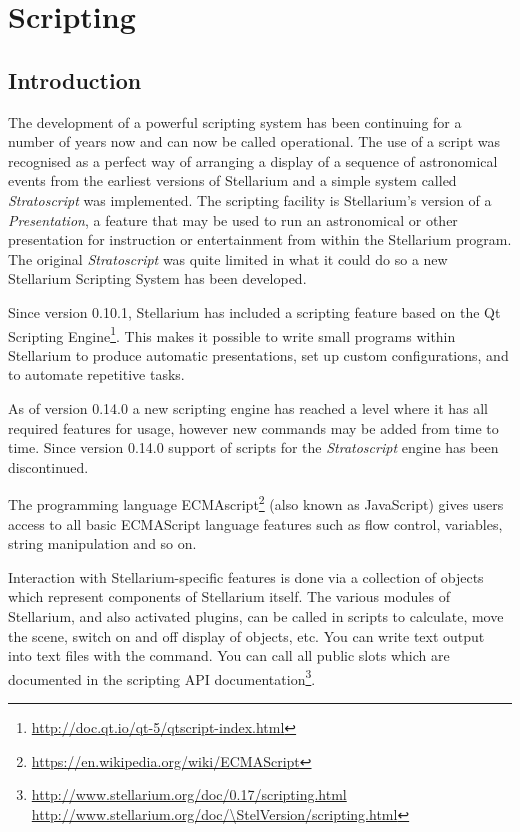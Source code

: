 
\chapter{Scripting}
\label{ch:scripting}

\section{Introduction}
\label{sec:scripting:introduction}


The development of a powerful scripting system has been continuing for
a number of years now and can now be called operational. The use of a
script was recognised as a perfect way of arranging a display of a
sequence of astronomical events from the earliest versions of
Stellarium and a simple system called \emph{Stratoscript} was
implemented. The scripting facility is Stellarium's version of a
\emph{Presentation}, a feature that may be used to run an astronomical
or other presentation for instruction or entertainment from within the
Stellarium program. The original \emph{Stratoscript} was quite limited in
what it could do so a new Stellarium Scripting System has been
developed.

Since version 0.10.1, Stellarium has included a scripting feature based on
the Qt Scripting
Engine\footnote{\url{http://doc.qt.io/qt-5/qtscript-index.html}}. This
makes it possible to write small programs within Stellarium to produce
automatic presentations, set up custom configurations, and to automate
repetitive tasks. 

As of version 0.14.0 a new scripting engine has reached a level where
it has all required features for usage, however new commands may be
added from time to time. Since version 0.14.0 support of scripts for
the \emph{Stratoscript} engine has been discontinued.

The programming language
ECMAscript\footnote{\url{https://en.wikipedia.org/wiki/ECMAScript}}
(also known as JavaScript) gives users access to all basic ECMAScript
language features such as flow control, variables, string manipulation
and so on.

Interaction with Stellarium-specific features is done via a collection
of objects which represent components of Stellarium itself.  The
various modules of Stellarium, and also activated plugins, can be
called in scripts to calculate, move the scene, switch on and off
display of objects, etc.  You can write text output into text files
with the  command.  You can call all public slots
which are documented in the scripting API documentation\footnote{%
%
	{\url{http://www.stellarium.org/doc/0.17/scripting.html}}%
	{\url{http://www.stellarium.org/doc/\StelVersion/scripting.html}}%
}.


